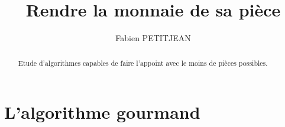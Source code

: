 \documentclass[10pt,a4paper,onecolumn]{article}
\author{Fabien PETITJEAN}
\title{Rendre la monnaie de sa pièce}
\begin{document}
\maketitle
\begin{abstract}
Etude d'algorithmes capables de faire l'appoint avec le moins de pièces possibles.
\end{abstract}

\section{L'algorithme gourmand}
\end{document}
